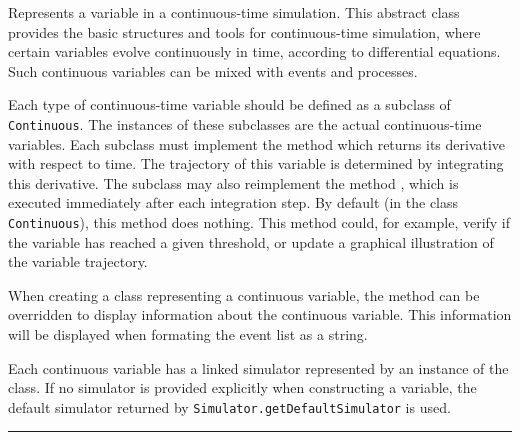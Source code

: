 
Represents a variable in a continuous-time simulation.
This abstract class provides the basic structures and tools
for continuous-time simulation, where certain variables evolve 
continuously in time, according to differential equations.
Such continuous variables can be mixed with events and processes.

Each type of continuous-time variable should be defined as a 
subclass of \texttt{Continuous}.
The instances of these subclasses are the actual continuous-time
variables.  Each subclass must implement the method
 which returns its derivative with respect to time.
The trajectory of this variable is determined by integrating this
derivative.
The subclass may also reimplement the method , 
which is executed immediately after each integration step.
By default (in the class \texttt{Continuous}), this method does nothing.
This method could, for example, verify if the variable has reached
a given threshold, or update a graphical illustration of the variable
trajectory.

When creating a class representing a continuous variable,
the  method can be overridden to display
information about the continuous variable.  This information will
be displayed when formating the event list as a string.

Each continuous variable has a linked simulator represented by an instance of the
 class.
If no simulator is provided explicitly when constructing a variable,
the default simulator returned by
\texttt{Simulator.getDefaultSimulator} is used.

\bigskip\hrule

